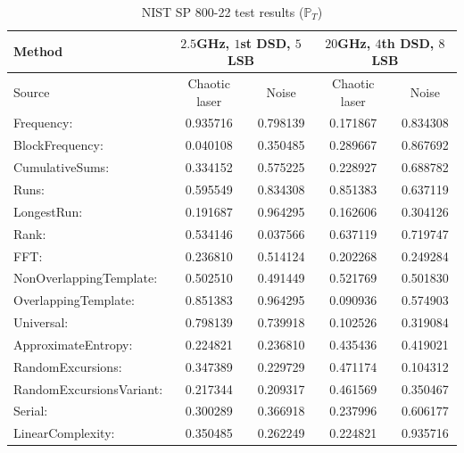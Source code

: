 \begin{table}[!t]
  \renewcommand{\arraystretch}{1.3}
  \caption{NIST SP 800-22 test results ($\mathbb{P}_T$)}
  \label{nist}
  \centering
  \begin{tabular}{l|c|c|c|c}
    \hline
    Method & \multicolumn{2}{c|}{$2.5$GHz, $1$st DSD, $5$LSB } & \multicolumn{2}{c}{ $20$GHz, $4$th DSD, $8$LSB  } \\ \hline
    Source & Chaotic laser& Noise & Chaotic laser& Noise  \\ \hline\hline
    Frequency: 	&  0.935716 &  0.798139 &  0.171867 &    0.834308 \\ \hline
    BlockFrequency: 	 & 0.040108 &  0.350485 &  0.289667 &    0.867692\\ \hline
    CumulativeSums: 	&  0.334152 &  0.575225 &  0.228927 &    0.688782\\ \hline
    Runs: 	&  0.595549 &  0.834308 &  0.851383 &    0.637119\\ \hline
    LongestRun: 	 & 0.191687 &  0.964295 &  0.162606 &    0.304126\\ \hline
    Rank: 	 & 0.534146 &  0.037566 &  0.637119 &    0.719747\\ \hline
    FFT: 	 & 0.236810 &  0.514124 &  0.202268 &    0.249284\\ \hline
    NonOverlappingTemplate: 	&  0.502510 &  0.491449 &  0.521769 &    0.501830 \\ \hline
    OverlappingTemplate: 	&  0.851383 &  0.964295 &  0.090936 &    0.574903\\ \hline
    Universal: 	  &0.798139 &  0.739918 &  0.102526 &    0.319084\\ \hline
    ApproximateEntropy: &	  0.224821 &  0.236810 &  0.435436 &    0.419021\\ \hline
    RandomExcursions: 	&  0.347389 &  0.229729 &  0.471174 &    0.104312\\ \hline
    RandomExcursionsVariant: &	  0.217344 &  0.209317 &  0.461569 &    0.350467\\ \hline
    Serial: 	 & 0.300289 &  0.366918 &  0.237996 &    0.606177\\ \hline
    LinearComplexity: &	  0.350485 &  0.262249 &  0.224821 &    0.935716\\ \hline

  \end{tabular}
\end{table}


